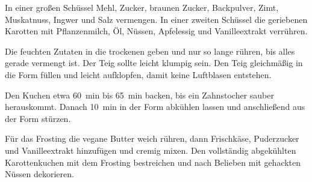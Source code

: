 \begin{recipeDP}
{        \step In einer großen Schüssel Mehl, Zucker, braunen Zucker, Backpulver, Zimt, Muskatnuss, Ingwer und Salz vermengen.
        In einer zweiten Schüssel die geriebenen Karotten mit Pflanzenmilch, Öl, Nüssen, Apfelessig und Vanilleextrakt verrühren.

        \step Die feuchten Zutaten in die trockenen geben und nur so lange rühren, bis alles gerade vermengt ist.
        Der Teig sollte leicht klumpig sein.
        Den Teig gleichmäßig in die Form füllen und leicht aufklopfen, damit keine Luftblasen entstehen.

        \step Den Kuchen etwa \SI{60}{\minute} bis \SI{65}{\minute} backen, bis ein Zahnstocher sauber herauskommt.
        Danach \SI{10}{\minute} in der Form abkühlen lassen und anschließend aus der Form stürzen.

        \step Für das Frosting die vegane Butter weich rühren, dann Frischkäse, Puderzucker und Vanilleextrakt hinzufügen und cremig mixen.
        Den vollständig abgekühlten Karottenkuchen mit dem Frosting bestreichen und nach Belieben mit gehackten Nüssen dekorieren.
    }


\end{recipeDP}
